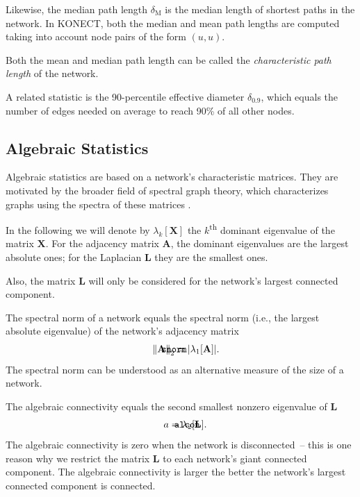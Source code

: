 \documentclass{article}
\def\mathnote#1{%
  \tag*{\rlap{\hspace\marginparsep\smash{\parbox[t]{\marginparwidth}{#1}}}}
}
\begin{document}
Likewise, the median path length $\delta_{\mathrm M}$ is the median
length of shortest paths in the network.  In KONECT, both the median and
mean path lengths are computed taking into account node pairs of the
form $(u,u)$.

Both the mean and median path length can be called the
\emph{characteristic path length} of the network.

A related statistic is the 90-percentile effective diameter
$\delta_{0.9}$, which equals the number of edges needed on average to
reach 90\% of all other nodes.

\subsection{Algebraic Statistics}

Algebraic statistics are based on a network's characteristic matrices.
They are motivated by the broader field of spectral graph theory, which
characterizes graphs using the spectra of these matrices \citep{b285}.

In the following we will denote by $\lambda_k[\mathbf X]$ the
$k$\textsuperscript{th} dominant eigenvalue of the matrix $\mathbf X$.
For the adjacency matrix $\mathbf A$, the dominant eigenvalues are the
largest absolute ones; for the Laplacian $\mathbf L$ they are the
smallest ones.

Also, the matrix $\mathbf L$ will only be considered for the network's
largest connected component.

The spectral norm of a network equals the spectral norm (i.e., the
largest absolute eigenvalue) of the network's adjacency matrix
\begin{align}
  \mathnote{\texttt{snorm}} 
  \left\| \mathbf A \right\|_2
  &= 
  | \lambda_1[\mathbf A] | .
\end{align}
The spectral norm can be understood as an alternative measure of the
size of a network.

The algebraic connectivity equals the second smallest nonzero eigenvalue
of $\mathbf L$ \citep{b652}
\begin{align}
  \mathnote{\texttt{alcon}} a &= \lambda_2[\mathbf L].
\end{align}
The algebraic connectivity is zero when the network is disconnected~--
this is one reason why we restrict the matrix $\mathbf L$ to each
network's giant connected component.  The algebraic connectivity is
larger the better the network's largest connected component is
connected.
\end{document}
